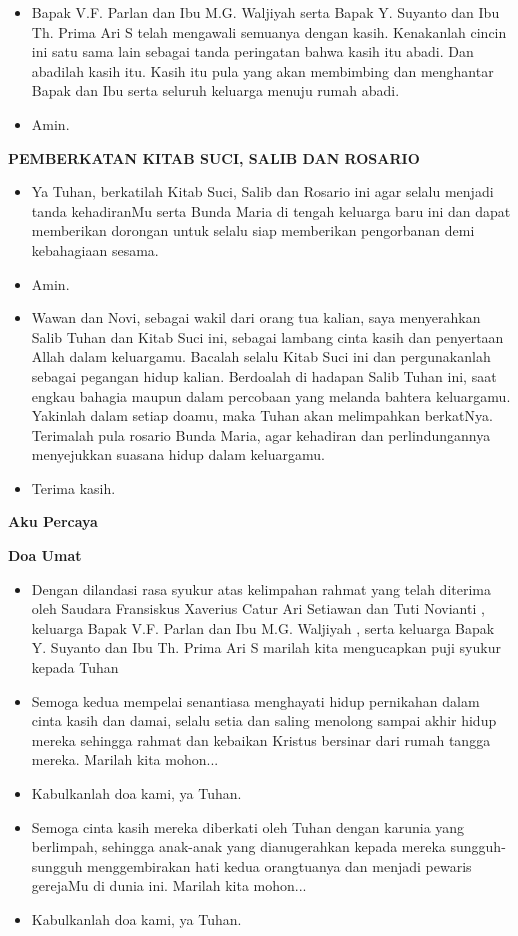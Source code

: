 \documentclass[10pt]{book}
\makeatletter
\newcommand{\subjudul}[1]{%
  {\parindent \z@ \normalfont
    \interlinepenalty\@M \bfseries #1\par\nobreak \vskip 20\p@ }}
\newcommand{\BU}[1]{\begin{itemize} \item[U:] #1 \end{itemize}}
\newcommand{\BI}[1]{\begin{itemize} \item[I:] #1 \end{itemize}}
\newcommand{\BP}[1]{\begin{itemize} \item[P:] #1 \end{itemize}}
\newcommand{\BMP}[1]{\begin{itemize} \item[W+N:] #1 \end{itemize}}
\newcommand{\suami}{V.F. Parlan }
\newcommand{\istri}{M.G. Waljiyah }
\newcommand{\suamidua}{Y. Suyanto }
\newcommand{\istridua}{Th. Prima Ari S }
\newcommand{\mempelaip}{Fransiskus Xaverius Catur Ari Setiawan }
\newcommand{\mempelaiw}{Tuti Novianti }
\makeatother
\begin{document}
\BI{Bapak \suami dan Ibu \istri serta Bapak \suamidua dan Ibu \istridua telah mengawali semuanya dengan kasih. Kenakanlah cincin ini satu sama lain sebagai tanda peringatan bahwa kasih itu abadi. Dan abadilah kasih itu. Kasih itu pula yang akan membimbing dan menghantar Bapak dan Ibu serta seluruh keluarga menuju rumah abadi.}

\BU{Amin.}

\subjudul{PEMBERKATAN KITAB SUCI, SALIB DAN ROSARIO}

\BI{Ya Tuhan, berkatilah Kitab Suci, Salib dan Rosario ini agar selalu menjadi tanda kehadiranMu serta Bunda Maria di tengah keluarga baru ini dan dapat memberikan dorongan untuk selalu siap memberikan pengorbanan demi kebahagiaan sesama.}

\BU{Amin.}

\BI{Wawan dan Novi, sebagai wakil dari orang tua kalian, saya menyerahkan Salib Tuhan dan Kitab Suci ini, sebagai lambang cinta kasih dan penyertaan Allah dalam keluargamu. Bacalah selalu Kitab Suci ini dan pergunakanlah sebagai pegangan hidup kalian. Berdoalah di hadapan Salib Tuhan ini, saat engkau bahagia maupun dalam percobaan yang melanda bahtera keluargamu. Yakinlah dalam setiap doamu, maka Tuhan akan melimpahkan berkatNya. Terimalah pula rosario Bunda Maria, agar kehadiran dan perlindungannya menyejukkan suasana hidup dalam keluargamu.}

\BMP{Terima kasih.}


\subjudul{Aku Percaya}

\subjudul{Doa Umat}

\BI{Dengan dilandasi rasa syukur atas kelimpahan rahmat yang telah diterima oleh Saudara \mempelaip dan \mempelaiw, keluarga Bapak \suami dan Ibu \istri, serta keluarga Bapak \suamidua dan Ibu \istridua marilah kita mengucapkan puji syukur kepada Tuhan}

\BP{Semoga kedua mempelai senantiasa menghayati hidup pernikahan dalam cinta kasih dan damai, selalu setia dan saling menolong sampai akhir hidup mereka sehingga rahmat dan kebaikan Kristus bersinar dari rumah tangga mereka. 
Marilah kita mohon...}

\BU{Kabulkanlah doa kami, ya Tuhan.}

\BP{Semoga cinta kasih mereka diberkati oleh Tuhan dengan karunia yang berlimpah, sehingga anak-anak yang dianugerahkan kepada mereka sungguh-sungguh menggembirakan hati kedua orangtuanya dan menjadi pewaris gerejaMu di dunia ini.
Marilah kita mohon...}

\BU{Kabulkanlah doa kami, ya Tuhan.}
\end{document}
